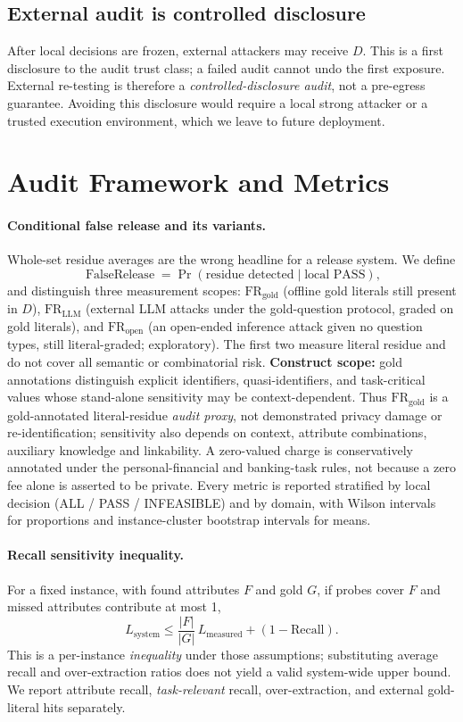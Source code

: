 \documentclass[journal]{IEEEtran}
\begin{document}
\subsection{External audit is controlled disclosure}
After local decisions are frozen, external attackers may receive $D$. This is a first disclosure to the audit trust class; a failed audit cannot undo the first exposure. External re-testing is therefore a \emph{controlled-disclosure audit}, not a pre-egress guarantee. Avoiding this disclosure would require a local strong attacker or a trusted execution environment, which we leave to future deployment.

\section{Audit Framework and Metrics}\label{sec:framework}

\paragraph{Conditional false release and its variants.} Whole-set residue averages are the wrong headline for a release system. We define
\[
\operatorname{FalseRelease}=\Pr(\text{residue detected}\mid\text{local PASS}),
\]
and distinguish three measurement scopes: $\mathrm{FR}_{\mathrm{gold}}$ (offline gold literals still present in $D$), $\mathrm{FR}_{\mathrm{LLM}}$ (external LLM attacks under the gold-question protocol, graded on gold literals), and $\mathrm{FR}_{\mathrm{open}}$ (an open-ended inference attack given no question types, still literal-graded; exploratory). The first two measure literal residue and do not cover all semantic or combinatorial risk. \textbf{Construct scope:} gold annotations distinguish explicit identifiers, quasi-identifiers, and task-critical values whose stand-alone sensitivity may be context-dependent. Thus $\mathrm{FR}_{\mathrm{gold}}$ is a gold-annotated literal-residue \emph{audit proxy}, not demonstrated privacy damage or re-identification; sensitivity also depends on context, attribute combinations, auxiliary knowledge and linkability. A zero-valued charge is conservatively annotated under the personal-financial and banking-task rules, not because a zero fee alone is asserted to be private. Every metric is reported stratified by local decision (ALL / PASS / INFEASIBLE) and by domain, with Wilson intervals~\cite{wilson1927} for proportions and instance-cluster bootstrap intervals for means.

\paragraph{Recall sensitivity inequality.} For a fixed instance, with found attributes $F$ and gold $G$, if probes cover $F$ and missed attributes contribute at most 1,
\[
L_{\mathrm{system}}\le \frac{|F|}{|G|}\,L_{\mathrm{measured}}+(1-\mathrm{Recall}).
\]
This is a per-instance \emph{inequality} under those assumptions; substituting average recall and over-extraction ratios does not yield a valid system-wide upper bound. We report attribute recall, \emph{task-relevant} recall, over-extraction, and external gold-literal hits separately.
\end{document}
